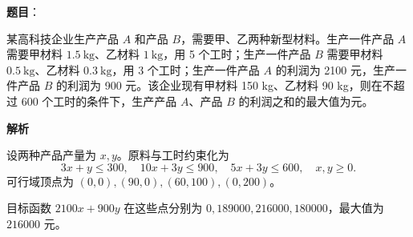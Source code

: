 \begin{answer}

\textbf{题目}：

某高科技企业生产产品 \(A\) 和产品 \(B\)，需要甲、乙两种新型材料。生产一件产品 \(A\) 需要甲材料 \(1.5\ \mathrm{kg}\)、乙材料 \(1\ \mathrm{kg}\)，用 5 个工时；生产一件产品 \(B\) 需要甲材料 \(0.5\ \mathrm{kg}\)、乙材料 \(0.3\ \mathrm{kg}\)，用 3 个工时；生产一件产品 \(A\) 的利润为 2100 元，生产一件产品 \(B\) 的利润为 900 元。该企业现有甲材料 150 kg、乙材料 90 kg，则在不超过 600 个工时的条件下，生产产品 \(A\)、产品 \(B\) 的利润之和的最大值为\gkblank{}元。

\textbf{解析}

设两种产品产量为 \(x,y\)。原料与工时约束化为
\nopagebreak[4]
\[
3x+y\le300,\quad10x+3y\le900,\quad5x+3y\le600,\quad x,y\ge0.
\]
可行域顶点为 \((0,0),(90,0),(60,100),(0,200)\)。

目标函数 \(2100x+900y\) 在这些点分别为 \(0,189000,216000,180000\)，最大值为 \(216000\) 元。


\end{answer}

